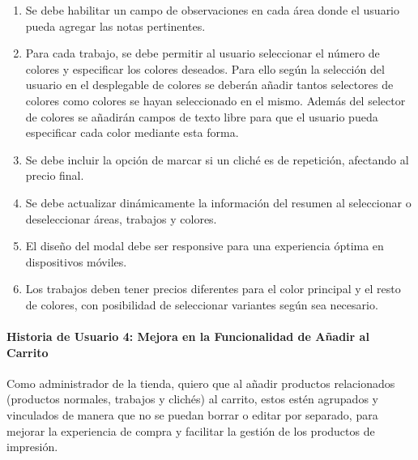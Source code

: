 \documentclass[12pt]{article}
\newcommand{\subsubsubsection}[1]{\paragraph{#1}}
\begin{document}
\begin{enumerate}[label=\arabic*.]
    \item Se debe habilitar un campo de observaciones en cada área donde el usuario pueda agregar las notas pertinentes.
    \item Para cada trabajo, se debe permitir al usuario seleccionar el número de colores y especificar los colores deseados. Para ello según la selección del usuario en el desplegable de colores se deberán añadir tantos selectores de colores como colores se hayan seleccionado en el mismo. Además del selector de colores se añadirán campos de texto libre para que el usuario pueda especificar cada color mediante esta forma.
    \item Se debe incluir la opción de marcar si un cliché es de repetición, afectando al precio final.
    \item Se debe actualizar dinámicamente la información del resumen al seleccionar o deseleccionar áreas, trabajos y colores.
    \item El diseño del modal debe ser responsive para una experiencia óptima en dispositivos móviles.
    \item Los trabajos deben tener precios diferentes para el color principal y el resto de colores, con posibilidad de seleccionar variantes según sea necesario.
\end{enumerate}


\subsubsubsection{Historia de Usuario 4: Mejora en la Funcionalidad de Añadir al Carrito}\label{sec:historia4}

Como administrador de la tienda,
quiero que al añadir productos relacionados (productos normales, trabajos y clichés) al carrito, estos estén agrupados y vinculados de manera que no se puedan borrar o editar por separado,
para mejorar la experiencia de compra y facilitar la gestión de los productos de impresión.
\end{document}
